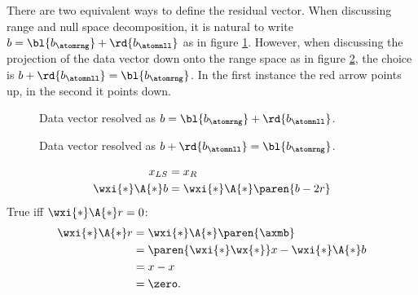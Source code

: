There are two equivalent ways to define the residual vector. When discussing range and null space decomposition, it is natural to write $b = \bl{b_{\atomrng}} +  \rd{b_{\atomnll}}$ as in figure \ref{fig:null up}. However, when discussing the projection of the data vector down onto the range space as in figure \ref{fig:null down}, the choice is $b +  \rd{b_{\atomnll}} = \bl{b_{\atomrng}}$. In the first instance the red arrow points up, in the second it points down.
\begin{figure}[htbp] %
   \centering
   \caption{Data vector resolved as $b = \bl{b_{\atomrng}} +  \rd{b_{\atomnll}}$.}
   \label{fig:null up}
\end{figure}

\begin{figure}[htbp] %
   \centering
   \caption{Data vector resolved as $b +  \rd{b_{\atomnll}} = \bl{b_{\atomrng}}$.}
    \label{fig:null down}
\end{figure}


  \begin{equation*}   %
    \begin{split}
      x_{LS} &= x_{R} \\
      \wxi{*} \A{*} b &= \wxi{*} \A{*} \paren{b - 2r}
    \end{split}
  \end{equation*}
True iff $\wxi{*} \A{*} r = 0$:
  \begin{equation*}   %
    \begin{split}
    \wxi{*} \A{*} r 
      & = \wxi{*} \A{*} \paren{\axmb} \\
      & = \paren{\wxi{*} \wx{*}} x - \wxi{*} \A{*} b \\
      & = x - x \\
      & = \zero.
    \end{split}
  \end{equation*}
  
